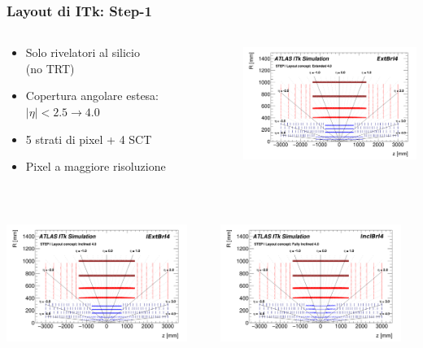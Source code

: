 \documentclass{beamer}
\begin{document}
\begin{frame}
\frametitle{Layout di ITk: Step-1}


\begin{columns}
\begin{column}{0.5\textwidth}
	\begin{itemize}
	\item Solo rivelatori al silicio \\ (no TRT)
	\item Copertura angolare estesa: $|\eta| < 2.5 \rightarrow 4.0$
	\item 5 strati di pixel + 4 SCT
	\item Pixel a maggiore risoluzione
	\end{itemize}
	\ \ \ \
\end{column}
\begin{column}{0.5\textwidth}
\includegraphics[width=\textwidth,height=3.8cm]{ExtBrl4}
\end{column}
\end{columns}

\begin{columns}
\begin{column}{0.5\textwidth}
\includegraphics[width=\textwidth,height=3.8cm]{IExtBrl4}
\end{column}
\begin{column}{0.5\textwidth}
\includegraphics[width=\textwidth,height=3.8cm]{InclBrl4}
\end{column}
\end{columns}

\end{frame}




\end{document}
